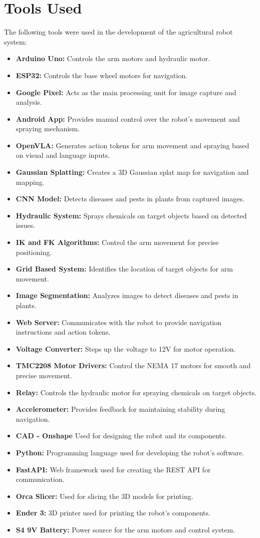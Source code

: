 \section{Tools Used}

The following tools were used in the development of the agricultural robot system:

\begin{itemize}
    \item \textbf{Arduino Uno:} Controls the arm motors and hydraulic motor.
    \item \textbf{ESP32:} Controls the base wheel motors for navigation.
    \item \textbf{Google Pixel:} Acts as the main processing unit for image capture and analysis.
    \item \textbf{Android App:} Provides manual control over the robot's movement and spraying mechanism.
    \item \textbf{OpenVLA:} Generates action tokens for arm movement and spraying based on visual and language inputs.
    \item \textbf{Gaussian Splatting:} Creates a 3D Gaussian splat map for navigation and mapping.
    \item \textbf{CNN Model:} Detects diseases and pests in plants from captured images.
    \item \textbf{Hydraulic System:} Sprays chemicals on target objects based on detected issues.
    \item \textbf{IK and FK Algorithms:} Control the arm movement for precise positioning.
    \item \textbf{Grid Based System:} Identifies the location of target objects for arm movement.
    \item \textbf{Image Segmentation:} Analyzes images to detect diseases and pests in plants.
    \item \textbf{Web Server:} Communicates with the robot to provide navigation instructions and action tokens.
    \item \textbf{Voltage Converter:} Steps up the voltage to 12V for motor operation.
    \item \textbf{TMC2208 Motor Drivers:} Control the NEMA 17 motors for smooth and precise movement.
    \item \textbf{Relay:} Controls the hydraulic motor for spraying chemicals on target objects.
    \item \textbf{Accelerometer:} Provides feedback for maintaining stability during navigation.
    \item \textbf{CAD - Onshape} Used for designing the robot and its components.
    \item \textbf{Python:} Programming language used for developing the robot's software.
    \item \textbf{FastAPI:} Web framework used for creating the REST API for communication.
    \item \textbf{Orca Slicer:} Used for slicing the 3D models for printing.
    \item \textbf{Ender 3:} 3D printer used for printing the robot's components.
    \item \textbf{S4 9V Battery:} Power source for the arm motors and control system.

\end{itemize}
